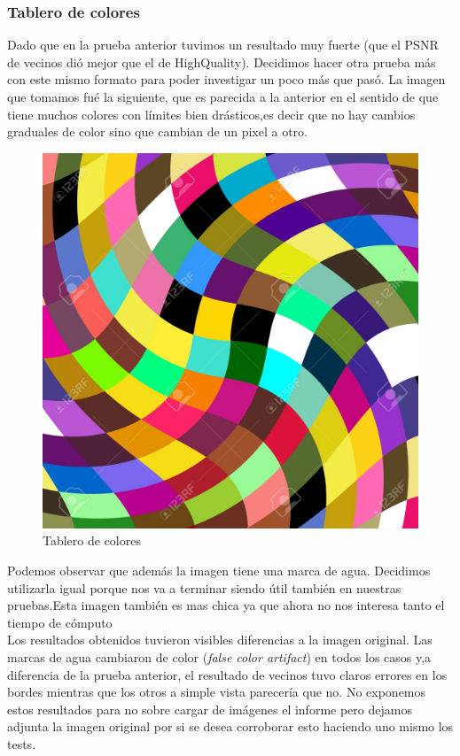 {\subsubsection{Tablero de colores}
Dado que en la prueba anterior tuvimos un resultado muy fuerte (que el PSNR de vecinos dió mejor que el de HighQuality). Decidimos hacer otra prueba más con este mismo formato para poder investigar un poco más que pasó.
La imagen que tomamos fué la siguiente, que es parecida a la anterior en el sentido de que tiene muchos colores con límites bien drásticos,es decir que no hay cambios graduales de color sino que cambian de un pixel a otro. 
\begin{figure}[!htb]
\begin{center}
       \includegraphics[scale=0.2]{imagenes/cuadrados_colores.png}
       \caption{Tablero de colores}
        \end{center}

\end{figure}

Podemos observar que además la imagen tiene una marca de agua. Decidimos utilizarla igual porque nos va a terminar siendo útil también en nuestras pruebas.Esta imagen también es mas chica ya que ahora no nos interesa tanto el tiempo de cómputo\\
Los resultados obtenidos tuvieron visibles diferencias a la imagen original. Las marcas de agua cambiaron de color (\textit{false color artifact}) en todos los casos y,a diferencia de la prueba anterior, el resultado de vecinos tuvo claros errores en los bordes mientras que los otros a simple vista parecería que no. No exponemos estos resultados para no sobre cargar de imágenes el informe pero dejamos adjunta la imagen original por si se desea corroborar esto haciendo uno mismo los tests.\\
}
